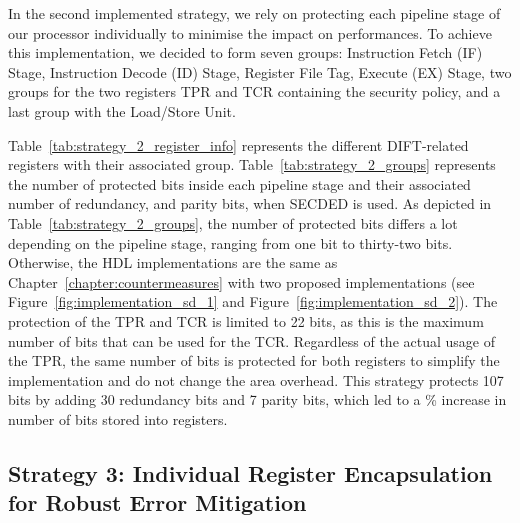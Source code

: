 In the second implemented strategy, we rely on protecting each pipeline stage of our processor individually to minimise the impact on performances. To achieve this implementation, we decided to form seven groups: Instruction Fetch (IF) Stage, Instruction Decode (ID) Stage, Register File Tag, Execute (EX) Stage, two groups for the two registers TPR and TCR containing the security policy, and a last group with the Load/Store Unit. 

Table~\ref{tab:strategy_2_register_info} represents the different DIFT-related registers with their associated group.
Table~\ref{tab:strategy_2_groups} represents the number of protected bits inside each pipeline stage and their associated number of redundancy, and parity bits, when SECDED is used. As depicted in Table~\ref{tab:strategy_2_groups}, the number of protected bits differs a lot depending on the pipeline stage, ranging from one bit to thirty-two bits.
Otherwise, the HDL implementations are the same as Chapter~\ref{chapter:countermeasures} with two proposed implementations (see Figure~\ref{fig:implementation_sd_1} and Figure~\ref{fig:implementation_sd_2}). The protection of the TPR and TCR is limited to 22 bits, as this is the maximum number of bits that can be used for the TCR. Regardless of the actual usage of the TPR, the same number of bits is protected for both registers to simplify the implementation and do not change the area overhead. This strategy protects 107 bits by adding 30 redundancy bits and 7 parity bits, which led to a \% increase in number of bits stored into registers.

\subsection{Strategy 3: Individual Register Encapsulation for Robust Error Mitigation}

